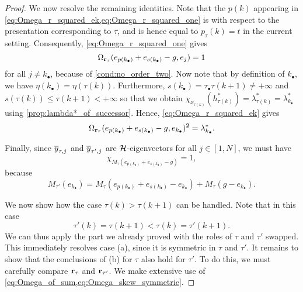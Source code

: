 \begin{proof}
	We now resolve the remaining identities. Note that the $p(k)$ appearing in
	\cref{eq:Omega_r_squared_ek,eq:Omega_r_squared_one} is with respect to the presentation
	corresponding to $\tau$, and is hence equal to $p_\tau(k) = t$ in the current setting.
	Consequently, \cref{eq:Omega_r_squared_one} gives
	\begin{equation*}
		\Omega_{\mathbf{r}_\tau}(e_{p(k_\bullet)} + e_{s(k_\bullet)} -g, e_j) = 1
	\end{equation*}
	for all $j\neq k_\bullet$, because of \cref{cond:no_order_two}. Now note that by definition of $k_\bullet$,
	we have $\eta(k_\bullet) = \eta(\tau(k))$. Furthermore, $s(k_\bullet) =
		\tau_\bullet\tau(k+1) \neq + \infty$ and $s(\tau(k)) \leq \tau(k+1) < + \infty$ so that
	we obtain $\chi_{x_{\tau(k)}}(h^*_{\tau(k)}) = \lambda^*_{\tau(k)} =
		\lambda^*_{k_\bullet}$ using \cref{prop:lambda*_of_successor}. Hence, \cref{eq:Omega_r_squared_ek} gives
	\begin{equation*}
		\Omega_{\mathbf{r}_\tau}(e_{p(k_\bullet)} + e_{s(k_\bullet)} - g, e_{k_\bullet})^2 = \lambda_{k_\bullet}^*.
	\end{equation*}

	Finally, since $\overline{y}_{\tau, j}$ and $\overline{y}_{\tau', j}$ are $\mathcal{H}$-eigenvectors for all
	$j\in [1, N]$, we must have
	\begin{equation*}
		\chi_{M_\tau(e_{p(k_\bullet)} + e_{s(k_\bullet)} - g)} = 1,
	\end{equation*}
	because
	\begin{equation*}
		M_{\tau'}(e_{k_\bullet}) =
		M_\tau(e_{p(k_\bullet)} + e_{s(k_\bullet)} - e_{k_\bullet}) + M_\tau(g-e_{k_\bullet}).
	\end{equation*}

	\medskip

	We now show how the case $\tau(k) > \tau(k+1)$ can be handled. Note that in this case
	\begin{equation*}
		\tau'(k) = \tau(k+1) < \tau(k) = \tau'(k+1).
	\end{equation*}
	We can thus apply the part we already proved with the roles of $\tau$ and $\tau'$
	swapped. This immediately resolves case (a), since it is symmetric in $\tau$ and
	$\tau'$. It remains to show that the conclusions of (b) for $\tau$ also hold for
	$\tau'$. To do this, we must carefully compare $\mathbf{r}_\tau$ and $\mathbf{r}_{\tau'}$. We make
	extensive use of \cref{eq:Omega_of_sum,eq:Omega_skew_symmetric}.


\end{proof}

